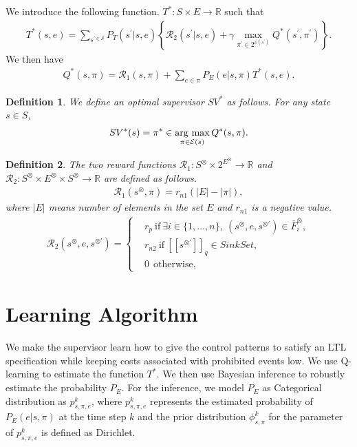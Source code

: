 \documentclass[letterpaper, 10 pt, conference]{ieeeconf}
\newtheorem{definition}{Definition}
\newcommand{\myspdq}{\ensuremath{[\![s^{\otimes \prime}]\!]}_q}
\newcommand{\argmax}{\mathop{\rm arg~max}\limits}
\begin{document}
We introduce the following function. $T^{\ast} : S \times E \rightarrow \mathbb{R}$ such that
\begin{align}
  T^{\ast}(s,e) = \sum_{s^{\prime \in S}} P_T(s^{\prime}|s,e) \left \{ \mathcal{R}_2(s^{\prime}|s,e) + \gamma \max_{\pi^{\prime} \in 2^{\mathcal{E}(s^{\prime})}} Q^{\ast}(s^{\prime}, \pi^{\prime}) \right \}.
\end{align}
We then have
\begin{align}
  Q^{\ast}(s,\pi) = \mathcal{R}_1(s,\pi) + \sum_{e \in \pi}P_E(e|s,\pi) T^{\ast}(s,e).
\end{align}
\begin{definition}
We define an optimal supervisor $SV^{\ast}$ as follows. For any state $s \in S$,
\begin{align}
  SV^{\ast}(s) = \pi^{\ast} \in \argmax_{\pi \in \mathcal{E}(s)} Q^{\ast}(s,\pi).
\end{align}
\end{definition}

\begin{definition}
  The two reward functions $\mathcal{R}_1 : S^{\otimes} \times 2^{E^{\otimes}} \rightarrow \mathbb{R}$ and $\mathcal{R}_2 : S^{\otimes} \times E^{\otimes} \times S^{\otimes} \rightarrow \mathbb{R}$ are defined as follows.
  \begin{align}
    \mathcal{R}_1 (s^{\otimes}, \pi) = r_{n1} (|E|-|\pi|),
  \end{align}
  where $|E|$ means number of elements in the set $E$ and $r_{n1}$ is a negative value.
  \begin{align}
    \mathcal{R}_2(s^{\otimes}, e, s^{\otimes \prime}) =
    \left\{
    \begin{aligned}
      &r_p \  \text{if}\ \exists i \in \! \{ 1, \ldots ,n \},\ (s^{\otimes}, e, s^{\otimes \prime}) \in \bar{F}^{\otimes}_i \!,\\
      &r_{n2} \ \text{if}\ \myspdq \in SinkSet,\\
      &0   \ \ \text{otherwise},
    \end{aligned}
    \right.
  \end{align}
\end{definition}
\section{Learning Algorithm}
We make the supervisor learn how to give the control patterns to satisfy an LTL specification while keeping costs associated with prohibited events low. We use Q-learning to estimate the function $T^{\ast}$. We then use Bayesian inference to robustly estimate the probability $P_E$. For the inference, we model $P_E$ as Categorical distribution as $p^k_{s,\pi,e}$, where $p^k_{s,\pi,e}$ represents the estimated probability of $P_E(e|s,\pi)$ at the time step $k$ and the prior distribution $\phi^k_{s,\pi}$ for the parameter of $p^k_{s,\pi,e}$ is defined as Dirichlet.
\end{document}
